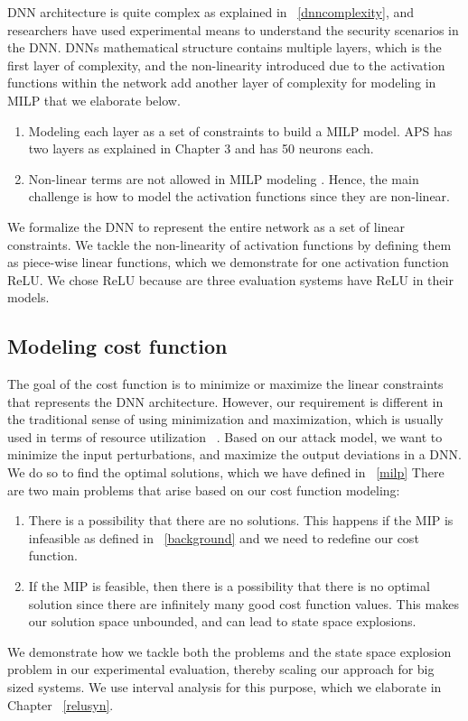 DNN architecture is quite complex as explained in ~\ref{dnncomplexity}, and researchers have used experimental means to understand the security scenarios in the DNN. 
\ac{DNN}s  mathematical structure contains multiple layers, which is the first layer of complexity, and the non-linearity introduced due to the activation functions within the network add another layer of complexity for modeling in \ac{MILP}  that we elaborate below. 
\begin{enumerate}
	\item Modeling each layer as a set of constraints to build a \ac{MILP} model.
	\ac{APS} has two layers as explained in Chapter 3 and has 50 neurons each. 
	\item Non-linear terms are not allowed in \ac{MILP} modeling \cite{gnonlinearity}. Hence, the main challenge is how to model the activation functions since they are non-linear. 
\end{enumerate}

We formalize the \ac{DNN} to represent the entire network as a set of linear constraints. 
We tackle the non-linearity of activation functions by defining them as piece-wise linear functions, 
which we demonstrate for one activation function ReLU.
We chose ReLU because are three evaluation systems have ReLU in their models. 

\subsection{Modeling cost function}
The goal of the cost function is to minimize or maximize the linear constraints that represents the \ac{DNN} architecture. 
However, our requirement is different in the traditional sense of using minimization and maximization, which is usually used in terms of resource utilization ~\cite{7214162}.  
Based on our attack model, we want to minimize the input perturbations, and maximize the output deviations in a \ac{DNN}.
We do so to find the optimal solutions, which we have defined in  ~\ref{milp}
There are two main problems that arise based on our cost function modeling:
\begin{enumerate}
	\item There is a possibility that there are no solutions. 
	This happens if the \ac{MIP} is infeasible as defined in ~\ref{background} and we need to redefine our cost function. 
	\item If the \ac{MIP} is feasible, then there is a possibility that there is no optimal solution since there are infinitely many good cost function values. 
	This makes our solution space unbounded, and can lead to state space explosions. 
\end{enumerate}

We demonstrate how we tackle both the problems and the state space explosion problem in our experimental evaluation, thereby scaling our approach for big sized systems. 
We use interval analysis for this purpose, which we elaborate in Chapter ~\ref{relusyn}. 


















